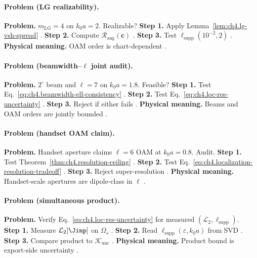 \paragraph{Problem (LG realizability).}
\textbf{Problem.} \(m_{\mathrm{LG}}=4\) on \(k_{0}a=2\). Realizable?
\textbf{Step 1.} Apply Lemma~\ref{lem:ch4.lg-vsh-spread} \cite{harrington2001,allen1992}.
\textbf{Step 2.} Compute \(\mathcal{R}_{\mathrm{ang}}(\mathbf{c})\) \cite{hansen1988}.
\textbf{Step 3.} Test \(\ell_{\mathrm{supp}}(10^{-2},2)\) \cite{stratton1941,devaney2004}.
\textbf{Physical meaning.} OAM order is chart-dependent \cite{harrington2001}.

\paragraph{Problem (beamwidth--\(\ell\) joint audit).}
\textbf{Problem.} \(2^{\circ}\) beam and \(\ell=7\) on \(k_{0}a=1.8\). Feasible?
\textbf{Step 1.} Test Eq.~\eqref{eq:ch4.beamwidth-ell-consistency} \cite{hansen1988,jackson1999}.
\textbf{Step 2.} Test Eq.~\eqref{eq:ch4.loc-res-uncertainty} \cite{stratton1941,harrington2001}.
\textbf{Step 3.} Reject if either fails \cite{devaney2004}.
\textbf{Physical meaning.} Beams and OAM orders are jointly bounded \cite{hansen1988}.

\paragraph{Problem (handset OAM claim).}
\textbf{Problem.} Handset aperture claims \(\ell=6\) OAM at \(k_{0}a=0.8\). Audit.
\textbf{Step 1.} Test Theorem~\ref{thm:ch4.resolution-ceiling} \cite{hansen1988,harrington2001}.
\textbf{Step 2.} Test Eq.~\eqref{eq:ch4.localization-resolution-tradeoff} \cite{jackson1999,stratton1941}.
\textbf{Step 3.} Reject super-resolution \cite{devaney2004}.
\textbf{Physical meaning.} Handset-scale apertures are dipole-class in \(\ell\) \cite{harrington2001}.

\paragraph{Problem (simultaneous product).}
\textbf{Problem.} Verify Eq.~\eqref{eq:ch4.loc-res-uncertainty} for measured \((\mathcal{L}_{2},\ell_{\mathrm{supp}})\).
\textbf{Step 1.} Measure \(\mathcal{L}_{2}[\Jimp]\) on \(\Omega_{s}\) \cite{jackson1999,stratton1941}.
\textbf{Step 2.} Read \(\ell_{\mathrm{supp}}(\varepsilon,k_{0}a)\) from SVD \cite{hansen1988,harrington2001}.
\textbf{Step 3.} Compare product to \(\mathcal{K}_{\mathrm{unc}}\) \cite{devaney2004}.
\textbf{Physical meaning.} Product bound is export-side uncertainty \cite{hansen1988}.

